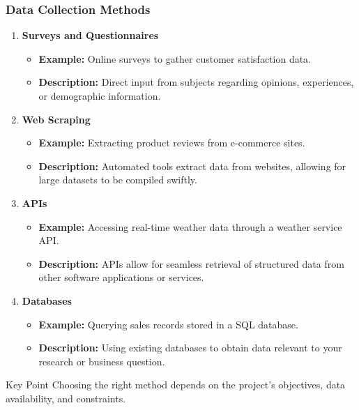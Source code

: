 \documentclass[aspectratio=169]{beamer}
\begin{document}
\begin{frame}[fragile]
    \frametitle{Data Collection Methods}
    \begin{enumerate}
        \item \textbf{Surveys and Questionnaires}
        \begin{itemize}
            \item \textbf{Example:} Online surveys to gather customer satisfaction data.
            \item \textbf{Description:} Direct input from subjects regarding opinions, experiences, or demographic information.
        \end{itemize}
    
        \item \textbf{Web Scraping}
        \begin{itemize}
            \item \textbf{Example:} Extracting product reviews from e-commerce sites.
            \item \textbf{Description:} Automated tools extract data from websites, allowing for large datasets to be compiled swiftly.
        \end{itemize}
    
        \item \textbf{APIs}
        \begin{itemize}
            \item \textbf{Example:} Accessing real-time weather data through a weather service API.
            \item \textbf{Description:} APIs allow for seamless retrieval of structured data from other software applications or services.
        \end{itemize}

        \item \textbf{Databases}
        \begin{itemize}
            \item \textbf{Example:} Querying sales records stored in a SQL database.
            \item \textbf{Description:} Using existing databases to obtain data relevant to your research or business question.
        \end{itemize}
    \end{enumerate}
    \begin{block}{Key Point}
        Choosing the right method depends on the project's objectives, data availability, and constraints.
    \end{block}
\end{frame}
\end{document}
